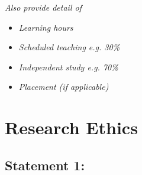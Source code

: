 \documentclass{MDXHandbook}
\begin{document}
\emph{Also provide detail of}
\begin{itemize}
\item \emph{Learning hours}
\item \emph{Scheduled teaching  e.g. 30\%}
\item \emph{Independent study e.g. 70\%}
\item \emph{Placement (if applicable)}
\end{itemize}

\section*{Research Ethics}
\subsection*{Statement 1:}
\end{document}
